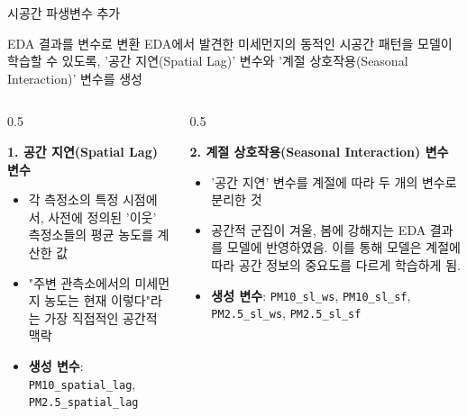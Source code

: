 \documentclass[serif, aspectratio=169]{beamer}
\begin{document}
\begin{frame}{시공간 파생변수 추가}
    \begin{block}{\small EDA 결과를 변수로 변환}
        \scriptsize
        EDA에서 발견한 미세먼지의 동적인 시공간 패턴을 모델이 학습할 수 있도록, '공간 지연(Spatial Lag)' 변수와 '계절 상호작용(Seasonal Interaction)' 변수를 생성
    \end{block}
    \vspace{0.5cm}
    \begin{columns}[T]
        \begin{column}{0.5\textwidth}
            \begin{block}{\scriptsize \textbf{1. 공간 지연(Spatial Lag) 변수}}
                \begin{itemize}\scriptsize
                    \item 각 측정소의 특정 시점에서, 사전에 정의된 '이웃' 측정소들의 평균 농도를 계산한 값
                    \item "주변 관측소에서의 미세먼지 농도는 현재 이렇다"라는 가장 직접적인 공간적 맥락
                    \item \textbf{생성 변수}: \texttt{PM10\_spatial\_lag}, \texttt{PM2.5\_spatial\_lag}
                \end{itemize}
            \end{block}
        \end{column}
        \begin{column}{0.5\textwidth}
            \begin{block}{\scriptsize \textbf{2. 계절 상호작용(Seasonal Interaction) 변수}}
                \begin{itemize}\scriptsize
                    \item '공간 지연' 변수를 계절에 따라 두 개의 변수로 분리한 것
                    \item 공간적 군집이 겨울, 봄에 강해지는 EDA 결과를 모델에 반영하였음. 이를 통해 모델은 계절에 따라 공간 정보의 중요도를 다르게 학습하게 됨.
                    \item \textbf{생성 변수}: \texttt{PM10\_sl\_ws}, \texttt{PM10\_sl\_sf}, \texttt{PM2.5\_sl\_ws}, \texttt{PM2.5\_sl\_sf}
                \end{itemize}
            \end{block}
        \end{column}
    \end{columns}
\end{frame}

\end{document}

